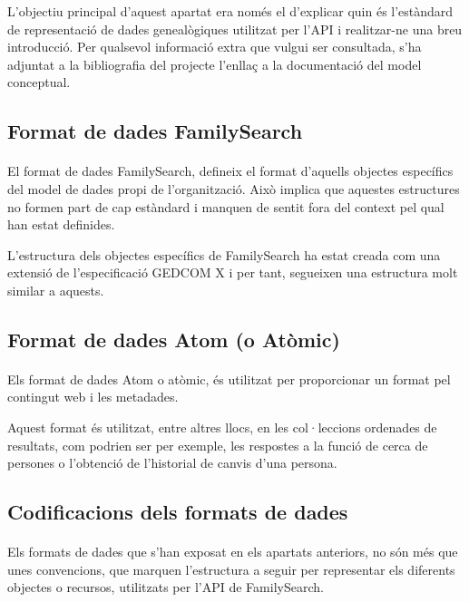          L’objectiu principal d’aquest apartat era només el d'explicar quin és l'estàndard de representació de dades genealògiques utilitzat per l'API i realitzar-ne una breu introducció. Per qualsevol informació extra que vulgui ser consultada, s'ha adjuntat a la bibliografia del projecte l’enllaç a la documentació del model conceptual.


     \subsection{Format de dades FamilySearch}

        \paragraph{}
        El format de dades FamilySearch, defineix el format d'aquells objectes específics del model de dades propi de l'organització. Això implica que aquestes estructures no formen part de cap estàndard i manquen de sentit fora del context pel qual han estat definides.

        L'estructura dels objectes específics de FamilySearch ha estat creada com una extensió de l'especificació GEDCOM X i per tant, segueixen una estructura molt similar a aquests.


    \subsection{Format de dades Atom (o Atòmic)}

        \paragraph{}
        Els format de dades Atom o atòmic, és utilitzat per proporcionar un format pel contingut web i les metadades.

        Aquest format és utilitzat, entre altres llocs, en les col·leccions ordenades de resultats, com podrien ser per exemple, les respostes a la funció de cerca de persones o l'obtenció de l'historial de canvis d’una persona.


    \subsection{Codificacions dels formats de dades}

        \paragraph{}
        Els formats de dades que s’han exposat en els apartats anteriors, no són més que unes convencions, que marquen l'estructura a seguir per representar els diferents objectes o recursos, utilitzats per l'API de FamilySearch.

